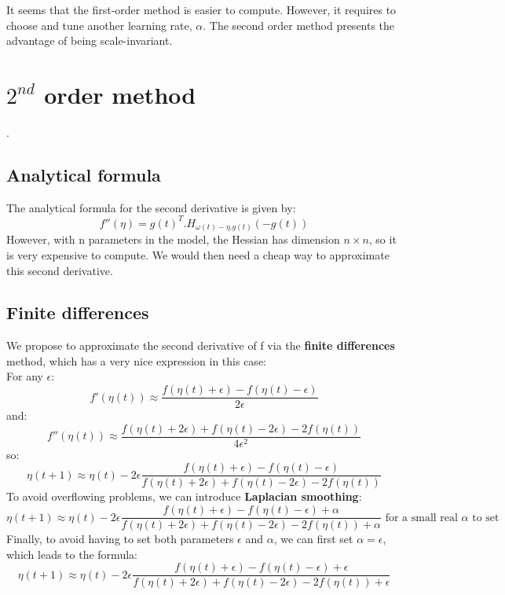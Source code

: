 \documentclass[]{article}
\begin{document}
It seems that the first-order method is easier to compute. However, it requires to choose and tune another learning rate, $\alpha$. The second order method presents the advantage of being scale-invariant.

\section{$2^{nd}$ order method}.

\subsection{Analytical formula}

The analytical formula for the second derivative is given by:\\
\begin{equation}
f''(\eta) = g(t)^{T}.H_{\omega(t)-\eta.g(t)}(-g(t))
\end{equation}
However, with n parameters in the model, the Hessian has dimension $n \times n$, so it is very expensive to compute. We would then need a cheap way to approximate this second derivative. 

\subsection{Finite differences}
We propose to approximate the second derivative of f via the \textbf{finite differences} method, which has a very nice expression in this case:\\
For any $\epsilon$:\\
\begin{equation}
f'(\eta(t)) \approx \frac{f(\eta(t)+\epsilon)-f(\eta(t)-\epsilon)}{2\epsilon}
\end{equation}
and:\\
\begin{equation}
f''(\eta(t)) \approx \frac{f(\eta(t)+2\epsilon)+f(\eta(t)-2\epsilon)-2f(\eta(t))}{4\epsilon^{2}}
\end{equation}
so:\\
\begin{equation}
\eta(t+1) \approx \eta(t) -2\epsilon\frac{f(\eta(t)+\epsilon)-f(\eta(t)-\epsilon)}{f(\eta(t)+2\epsilon)+f(\eta(t)-2\epsilon)-2f(\eta(t))}
\end{equation}
To avoid overflowing problems, we can introduce \textbf{Laplacian smoothing}:
\begin{equation}
\eta(t+1) \approx \eta(t) -2\epsilon\frac{f(\eta(t)+\epsilon)-f(\eta(t)-\epsilon) + \alpha}{f(\eta(t)+2\epsilon)+f(\eta(t)-2\epsilon)-2f(\eta(t)) + \alpha} \text{ for a small real $\alpha$ to set}
\end{equation}
Finally, to avoid having to set both parameters $\epsilon$ and $\alpha$, we can first set $\alpha=\epsilon$, which leads to the formula:
\begin{equation}
\eta(t+1) \approx \eta(t) -2\epsilon\frac{f(\eta(t)+\epsilon)-f(\eta(t)-\epsilon) + \epsilon}{f(\eta(t)+2\epsilon)+f(\eta(t)-2\epsilon)-2f(\eta(t)) + \epsilon} 
\end{equation}
\end{document}
